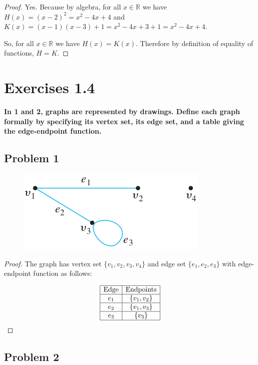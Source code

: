 \documentclass[14pt]{extarticle}
\newcommand{\R}{\mathbb{R}}
\begin{document}
\begin{proof}
Yes. Because by algebra, for all $x \in \R$ we have
$H(x) = (x - 2)^2 = x^2 - 4x + 4$ and
$K(x) = (x - 1)(x - 3) + 1 = x^2 - 4x + 3 + 1 = x^2 - 4x + 4$.

So, for all $x \in \R$ we have $H(x) = K(x)$. Therefore by definition of
equality of functions, $H = K$.
\end{proof}

\section {Exercises 1.4}

{\bf In 1 and 2, graphs are represented by drawings. Define each graph
formally by specifying its vertex set, its edge set, and a table giving the
edge-endpoint function.}

\subsection{Problem 1}

\begin{figure}[ht!]
\centering
\includegraphics[scale=0.5]{../images/1.4.1.png}
\end{figure}

\begin{proof}
The graph has vertex set $\{v_1, v_2, v_3, v_4\}$ and edge set
$\{e_1, e_2, e_3\}$ with edge-endpoint function as follows:

$$
\begin{array}{|c|c|}
\hline
\text{Edge} & \text{Endpoints} \\
\hline
e_1 & \{v_1, v_2\} \\
\hline
e_2 & \{v_1, v_3\} \\
\hline
e_3 & \{v_3\} \\
\hline
\end{array}
$$
\end{proof}

\subsection{Problem 2}
\end{document}

